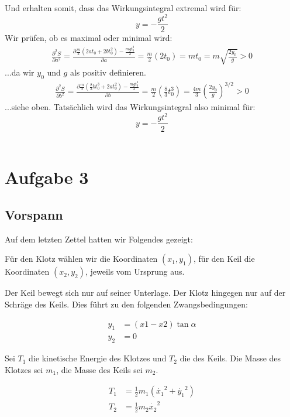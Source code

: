 \documentclass[a4paper,german,12pt,smallheadings]{scrartcl}
\begin{document}
Und erhalten somit, dass das Wirkungsintegral extremal wird für:
\begin{equation}
y=-\frac{gt^2}{2}
\end{equation}
Wir prüfen, ob es maximal oder minimal wird:
\begin{align*}
\frac{\partial^2 S}{\partial a^2}=\frac{\partial \frac{m}{2}\left(2at_0+2bt_0^2\right)-\frac{mgt_0^2}{2}}{\partial a}=\frac{m}{2}\left(2t_0\right)=mt_0=m \sqrt{\frac{2y_0}{g}}>0
\end{align*}
...da wir $y_0$ und $g$ als positiv definieren.
\begin{align*}
\frac{\partial^2 S}{\partial b^2}=\frac{\partial \frac{m}{2}\left(\frac{8}{3}bt_0^3+2at_0^2\right)-\frac{mgt_0^3}{3}}{\partial b}=\frac{m}{2}\left(\frac{8}{3}t_0^3\right)=\frac{4m}{3} \left(\frac{2y_0}{g}\right)^{3/2}>0
\end{align*}
...siehe oben. Tatsächlich wird das Wirkungsintegral also minimal für:
\begin{equation}
y=-\frac{gt^2}{2}
\end{equation}
\\
\section*{Aufgabe 3}
\subsection*{Vorspann}
Auf dem letzten Zettel hatten wir Folgendes gezeigt:

Für den Klotz wählen wir die Koordinaten $(x_1, y_1)$, für den Keil die
Koordinaten $(x_2, y_2)$, jeweils vom Ursprung aus.

Der Keil bewegt sich nur auf seiner Unterlage. Der Klotz hingegen nur auf der
Schräge des Keils. Dies führt zu den folgenden Zwangsbedingungen:


\begin{align*}
  y_1 &= (x1-x2) \tan \alpha \\
  y_2 &= 0
\end{align*}

Sei $T_1$ die kinetische Energie des Klotzes und $T_2$ die des Keils. Die Masse
des Klotzes sei $m_1$, die Masse des Keils sei $m_2$.

\begin{align*}
  T_1 &= \frac{1}{2} m_1 \left(\dot{x_1}^2 + \dot{y_1}^2\right) \\
  T_2 &= \frac{1}{2} m_2 \dot{x_2}^2
\end{align*}
\end{document}
